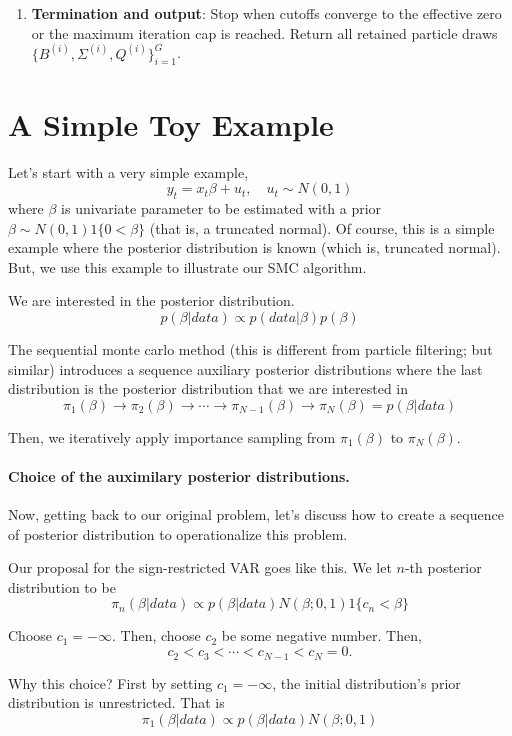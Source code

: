 \documentclass[11pt]{article}
\begin{document}
\begin{enumerate}[leftmargin=*]
\begin{enumerate}[label*=\arabic*., leftmargin=*]
    \end{enumerate}
    \item \textbf{Termination and output}: Stop when cutoffs converge to the effective zero or the maximum iteration cap is reached. Return all retained particle draws $\{B^{(i)},\Sigma^{(i)},Q^{(i)}\}_{i=1}^G$.
\end{enumerate}


\section{A Simple Toy Example}
Let's start with a very simple example,
\[
y_{t} = x_{t} \beta + u_{t}, \quad u_{t} \sim N(0,1)
\]
where $\beta$ is univariate parameter to be estimated with a prior $\beta \sim N(0,1) 1\{0 < \beta \}$ (that is, a truncated normal). Of course, this is a simple example where the posterior distribution is known (which is, truncated normal). But, we use this example to illustrate our SMC algorithm.

We are interested in the posterior distribution.
\[
p(\beta|data)  \propto p(data|\beta) p(\beta)
\]


The sequential monte carlo method (this is different from particle filtering; but similar) introduces a sequence auxiliary posterior distributions where the last distribution is the posterior distribution that we are interested in
\[
\pi_{1}(\beta) \rightarrow \pi_{2}(\beta) \rightarrow \cdots \rightarrow \pi_{N-1}(\beta) \rightarrow \pi_{N}(\beta)=p(\beta|data)
\]

Then, we iteratively apply importance sampling from $\pi_{1}(\beta)$ to $\pi_{N}(\beta)$. 

\paragraph{Choice of the auximilary posterior distributions.}

Now, getting back to our original problem, let's discuss how to create a sequence of posterior distribution to operationalize this problem.

Our proposal for the sign-restricted VAR goes like this. We let $n$-th posterior distribution to be 
\[
\pi_{n}(\beta|data) \propto p(\beta|data) N(\beta; 0, 1) 1\{ c_{n} < \beta\}
\]

Choose $c_{1} = -\infty$. Then, choose $c_{2}$ be some negative number. Then,
\[
c_{2} < c_{3} < \cdots < c_{N-1} < c_{N} = 0.
\]


Why this choice? First by setting $c_{1} = -\infty$, the initial distribution's prior distribution is unrestricted. That is
\[
\pi_{1}(\beta|data) \propto p(\beta|data) N(\beta; 0,1)
\]
\end{document}
